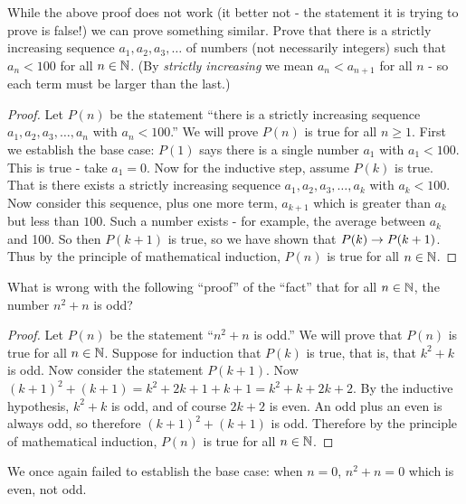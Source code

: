\begin{questions}
\question While the above proof does not work (it better not - the statement it is trying to prove is false!)  we can prove something similar.  Prove that there is a strictly increasing sequence $a_1, a_2, a_3, \ldots$ of numbers (not necessarily integers) such that $a_n < 100$ for all $n \in \mathbb N$.  (By {\em strictly increasing} we mean $a_n < a_{n+1}$ for all $n$ - so each term must be larger than the last.)

	\begin{answer}
		\begin{proof}
		 Let $P(n)$ be the statement ``there is a strictly increasing sequence $a_1, a_2, a_3, \ldots, a_n$ with $a_n < 100$.''  We will prove $P(n)$ is true for all $n \ge 1$. First we establish the base case: $P(1)$ says there is a single number $a_1$ with $a_1 < 100$.  This is true - take $a_1 = 0$.  Now for the inductive step, assume $P(k)$ is true.  That is there exists a strictly increasing sequence $a_1, a_2, a_3, \ldots, a_k$ with $a_k < 100$.  Now consider this sequence, plus one more term, $a_{k+1}$ which is greater than $a_k$ but less than $100$.  Such a number exists - for example, the average between $a_k$ and 100.  So then $P(k+1)$ is true, so we have shown that $P(k) \rightarrow P(k+1)$.  Thus by the principle of mathematical induction, $P(n)$ is true for all $n \in \mathbb N$.
		\end{proof}
		
	\end{answer}
	
	
	



\question What is wrong with the following ``proof'' of the ``fact'' that for all $n \in \mathbb N$, the number $n^2 + n$ is odd?
  \begin{proof}
    Let $P(n)$ be the statement ``$n^2 + n$ is odd.''  We will prove that $P(n)$ is true for all $n \in \mathbb N$.  Suppose for induction that $P(k)$ is true, that is, that $k^2 + k$ is odd.  Now consider the statement $P(k+1)$.  Now $(k+1)^2 + (k+1) = k^2 + 2k + 1 + k + 1 = k^2 + k + 2k + 2$.  By the inductive hypothesis, $k^2 + k$ is odd, and of course $2k + 2$ is even.  An odd plus an even is always odd, so therefore $(k+1)^2 + (k+1)$ is odd.  Therefore by the principle of mathematical induction, $P(n)$ is true for all $n \in \mathbb N$.
  \end{proof}
  
  	\begin{answer}
  		We once again failed to establish the base case: when $n = 0$, $n^2 + n = 0$ which is even, not odd.
  	\end{answer}
  	

\end{questions}
